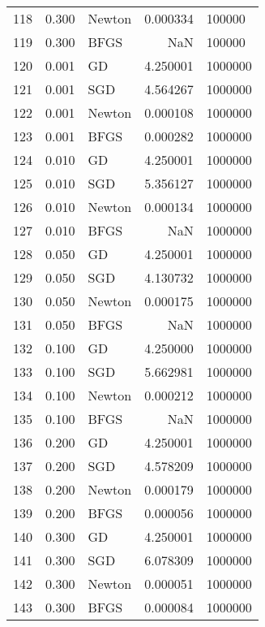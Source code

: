 \begin{tabular}{lrlrl}
118 &  0.300 &  Newton &  0.000334 &   100000 \\
119 &  0.300 &    BFGS &       NaN &   100000 \\
120 &  0.001 &      GD &  4.250001 &  1000000 \\
121 &  0.001 &     SGD &  4.564267 &  1000000 \\
122 &  0.001 &  Newton &  0.000108 &  1000000 \\
123 &  0.001 &    BFGS &  0.000282 &  1000000 \\
124 &  0.010 &      GD &  4.250001 &  1000000 \\
125 &  0.010 &     SGD &  5.356127 &  1000000 \\
126 &  0.010 &  Newton &  0.000134 &  1000000 \\
127 &  0.010 &    BFGS &       NaN &  1000000 \\
128 &  0.050 &      GD &  4.250001 &  1000000 \\
129 &  0.050 &     SGD &  4.130732 &  1000000 \\
130 &  0.050 &  Newton &  0.000175 &  1000000 \\
131 &  0.050 &    BFGS &       NaN &  1000000 \\
132 &  0.100 &      GD &  4.250000 &  1000000 \\
133 &  0.100 &     SGD &  5.662981 &  1000000 \\
134 &  0.100 &  Newton &  0.000212 &  1000000 \\
135 &  0.100 &    BFGS &       NaN &  1000000 \\
136 &  0.200 &      GD &  4.250001 &  1000000 \\
137 &  0.200 &     SGD &  4.578209 &  1000000 \\
138 &  0.200 &  Newton &  0.000179 &  1000000 \\
139 &  0.200 &    BFGS &  0.000056 &  1000000 \\
140 &  0.300 &      GD &  4.250001 &  1000000 \\
141 &  0.300 &     SGD &  6.078309 &  1000000 \\
142 &  0.300 &  Newton &  0.000051 &  1000000 \\
143 &  0.300 &    BFGS &  0.000084 &  1000000 \\
\bottomrule
\end{tabular}
